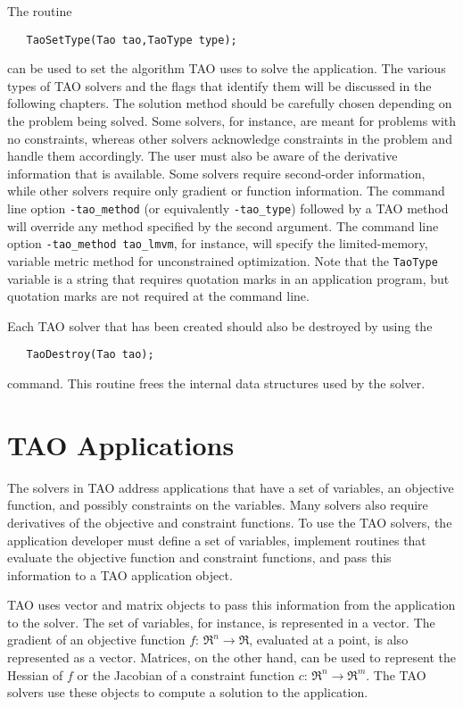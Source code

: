 The routine
\begin{verbatim}
   TaoSetType(Tao tao,TaoType type);
\end{verbatim}
\noindent
can be used to set the algorithm TAO uses to solve the application.
The various types of TAO solvers and the flags that identify them 
will be discussed in the following chapters.
The solution method should be carefully chosen depending on
the problem being solved.  Some solvers, for instance, are meant for
problems with no constraints, whereas other solvers acknowledge constraints
in the problem and handle them accordingly.
The user must also be aware of the derivative information that is available.
Some solvers require second-order information, while other solvers require
only gradient or function information.
The command line option \texttt{-tao\_method} (or equivalently 
\texttt{-tao\_type}) followed by a TAO method
will override any method specified by the second argument.
The command line option {\tt -tao\_method tao\_lmvm}, for instance,
will specify the limited-memory, variable metric method for unconstrained
optimization.  Note that the {\tt TaoType} variable is a string that requires
quotation marks in an application program, but quotation marks are not required
at the command line.

Each TAO solver that has been created should also be destroyed by using
the  
\begin{verbatim}
   TaoDestroy(Tao tao);
\end{verbatim}
command. 
This routine frees the internal data structures used by the solver.


\section{TAO Applications}
\label{section:taoapplication}
\label{section:petscapp}

The solvers in TAO address applications that have a set of variables, an objective
function, and possibly constraints on the variables.  Many solvers also
require derivatives
of the objective and constraint functions.
To use the TAO solvers, the application developer must 
define a set of variables, implement routines that evaluate the 
objective function and constraint functions, and pass this information
to a TAO application object.   

TAO uses vector and matrix objects to pass this information from the
application to the solver.   The set of variables, for instance, is
represented in a vector.
The gradient of an objective function $f: \, \Re^n \to \Re$,
evaluated at a point, is also represented as a vector.
Matrices,  on the other hand,
can be used to represent the Hessian of $f$ or the Jacobian of a constraint
function $c: \, \Re^n \to \Re^m$.  The TAO solvers use
these objects to compute a solution to the application.

